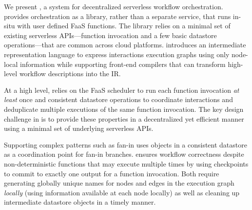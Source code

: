 We present \name{}, a system for decentralized serverless workflow
orchestration. \name{} provides orchestration as a library, rather than a
separate service, that runs in-situ with user defined FaaS functions. The
library relies on a minimal set of existing serverless APIs---function
invocation and a few basic datastore operations---that are common across cloud
platforms. \name{} introduces an intermediate representation language to express
interactions execution graphs using only node-local information while supporting
front-end compilers that can transform high-level workflow descriptions
into the IR.

At a high level, \name{} relies on the FaaS scheduler to run each function
invocation \emph{at least} once and consistent datastore operations to
coordinate interactions and deduplicate multiple executions of the same
function invocation. The key design challenge in \name{} is to provide these
properties in a decentralized yet efficient manner using a minimal set of
underlying serverless APIs.

Supporting complex patterns such as fan-in uses objects in a consistent
datastore as a coordination point for fan-in branches. \name{} ensures workflow
correctness despite non-deterministic functions that may execute multiple times
by using checkpoints to commit to exactly one output for a function invocation. Both
require generating globally unique names for nodes and edges in the execution
graph \emph{locally} (using information available at each node locally) as well
as cleaning up intermediate datastore objects in a timely manner.

